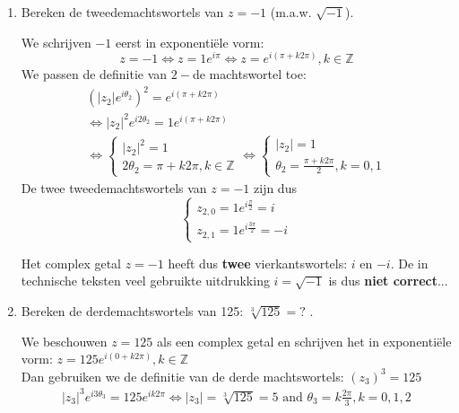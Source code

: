 \begin{enumerate}
	\item Bereken de tweedemachtswortels van $z=-1$ (m.a.w. $\sqrt{-1}$).\\
	
	\vspace{0.5cm}
	
	We schrijven $-1$ eerst in exponenti\"{e}le vorm:
	\[ z=-1 \iff z=1 e^{i\pi} \iff z=e^{i(\pi+k2\pi)}, k\in\mathbb{Z} \]
	We passen de definitie van $2-$de machtswortel toe:
	\[ \begin{array}{l} 
	(|z_{2}| e^{i \theta_{2}})^2 = e^{i(\pi + k2\pi)}  \\
	\iff |z_{2}|^2 e^{i2\theta_{2}} = 1e^{i(\pi + k2\pi)} \\
	\iff   \left\{ \begin{array}{l} |z_{2}|^2 =1 \\
	2\theta_{2}=\pi +k2\pi, k\in \mathbb{Z} \end{array} \right.
	\iff \left\{ \begin{array}{l} |z_{2}|=1 \\
	\theta_{2}=\frac{\pi + k2\pi}{2}, k=0,1 \end{array} \right.
	\end{array} 	  \]
	De twee tweedemachtswortels van $z=-1$ zijn dus
	\[  \left\{ \begin{array}{l} z_{2,0}=1e^{i\frac{\pi}{2}}= i \\
	z_{2,1}=1e^{i\frac{3\pi}{2}} = -i
	\end{array} \right.				 	
	\]
	
	Het complex getal $z=-1$ heeft dus {\bf twee} vierkantswortels: $i$ en $-i$. De in technische teksten veel gebruikte uitdrukking $i=\sqrt{-1}$ is dus {\bf niet correct}... 
	\item Bereken de derdemachtswortels van 125: $\sqrt[3]{125}=?$ .\\
	
	\vspace{0.5cm}
	
	We beschouwen $z=125$ als een complex getal en schrijven het in exponenti\"{e}le vorm: $z=125e^{i(0+k2\pi)}, k\in\mathbb{Z}$\\ Dan gebruiken we de definitie van de derde machtswortels: $(z_{3})^3 =125$ \\
	
	\[ \begin{array}{l} 
	|z_{3}|^3 e^{i3\theta_{3}} = 125e^{ik2\pi} 
	\iff |z_{3}|=\sqrt[3]{125}=5 \text{ and } \theta_{3}=k\frac{2\pi}{3}, k=0,1,2 
	\end{array} 
	\]
	

\end{enumerate}
